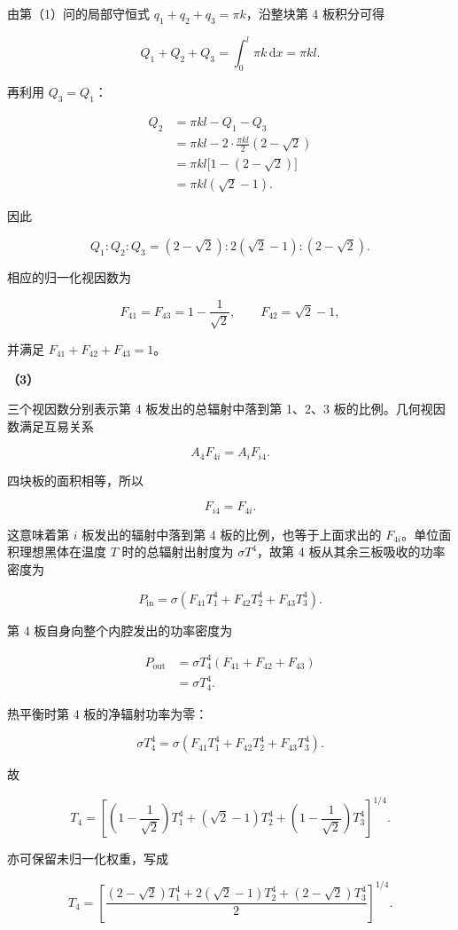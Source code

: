 \documentclass[12pt,a4paper,UTF8]{ctexart}
\begin{document}
由第（1）问的局部守恒式 \(q_1+q_2+q_3=\pi k\)，沿整块第 4 板积分可得

\[Q_1+Q_2+Q_3
=\int_0^l\pi k\,\mathrm dx
=\pi kl.\]

再利用 \(Q_3=Q_1\)：

\[\begin{aligned}
Q_2
&=\pi kl-Q_1-Q_3\\
&=\pi kl-2\cdot\frac{\pi kl}{2}(2-\sqrt2)\\
&=\pi kl\bigl[1-(2-\sqrt2)\bigr]\\
&=\pi kl(\sqrt2-1).
\end{aligned}\]

因此

\[\boxed{
Q_1:Q_2:Q_3
=(2-\sqrt2):2(\sqrt2-1):(2-\sqrt2)
}.\]

相应的归一化视因数为

\[F_{41}=F_{43}=1-\frac1{\sqrt2},\qquad
F_{42}=\sqrt2-1,\]

并满足 \(F_{41}+F_{42}+F_{43}=1\)。

\textbf{（3）}

三个视因数分别表示第 4 板发出的总辐射中落到第 1、2、3
板的比例。几何视因数满足互易关系

\[A_4F_{4i}=A_iF_{i4}.\]

四块板的面积相等，所以

\[F_{i4}=F_{4i}.\]

这意味着第 \(i\) 板发出的辐射中落到第 4 板的比例，也等于上面求出的
\(F_{4i}\)。单位面积理想黑体在温度 \(T\) 时的总辐射出射度为
\(\sigma T^4\)，故第 4 板从其余三板吸收的功率密度为

\[P_{\mathrm{in}}
=\sigma\left(F_{41}T_1^4+F_{42}T_2^4+F_{43}T_3^4\right).\]

第 4 板自身向整个内腔发出的功率密度为

\[\begin{aligned}
P_{\mathrm{out}}
&=\sigma T_4^4(F_{41}+F_{42}+F_{43})\\
&=\sigma T_4^4.
\end{aligned}\]

热平衡时第 4 板的净辐射功率为零：

\[\sigma T_4^4
=\sigma\left(F_{41}T_1^4+F_{42}T_2^4+F_{43}T_3^4\right).\]

故

\[\boxed{
T_4=
\left[
\left(1-\frac1{\sqrt2}\right)T_1^4
+(\sqrt2-1)T_2^4
+\left(1-\frac1{\sqrt2}\right)T_3^4
\right]^{1/4}
}.\]

亦可保留未归一化权重，写成

\[\boxed{
T_4=
\left[
\frac{(2-\sqrt2)T_1^4
+2(\sqrt2-1)T_2^4
+(2-\sqrt2)T_3^4}{2}
\right]^{1/4}
}.\]
\end{document}
